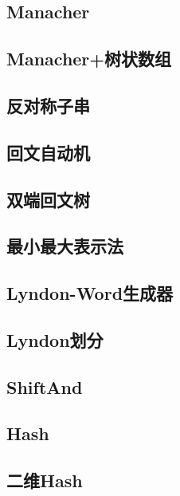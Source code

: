 \documentclass{article}
\begin{document}
\subsection{Manacher} 

\subsection{Manacher+树状数组} 

\subsection{反对称子串} 

\subsection{回文自动机} 

\subsection{双端回文树} 


\subsection{最小最大表示法} 

\subsection{Lyndon-Word生成器} 

\subsection{Lyndon划分} 


\subsection{ShiftAnd} 


\subsection{Hash} 

\subsection{二维Hash} 

\end{document}
